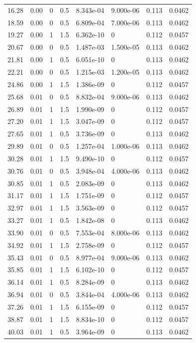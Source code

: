 \documentclass[preview]{standalone}
\begin{document}
{{\begin{tabular}{L{1.2cm}C{1.2cm} C{0.3cm}C{0.5cm} C{1.4cm}C{1.4cm} C{1.4cm}C{1.4cm}}
  16.28  &  0.00  & 0     & 0.5 &  8.343e-04  & 9.000e-06  & 0.113 &  0.0462   \\ 
  18.59  &  0.00  & 0     & 0.5 &  6.809e-04  & 7.000e-06  & 0.113 &  0.0462   \\ 
  19.27  &  0.00  & 1     & 1.5 &  6.362e-10  & 0  & 0.112 &  0.0457   \\ 
  20.67  &  0.00  & 0     & 0.5 &  1.487e-03  & 1.500e-05  & 0.113 &  0.0462   \\ 
  21.81  &  0.00  & 1     & 0.5 &  6.051e-10  & 0  & 0.113 &  0.0462   \\ 
  22.21  &  0.00  & 0     & 0.5 &  1.215e-03  & 1.200e-05  & 0.113 &  0.0462   \\ 
  24.86  &  0.00  & 1     & 1.5 &  1.386e-09  & 0  & 0.112 &  0.0457   \\ 
  25.68  &  0.01  & 0     & 0.5 &  8.832e-04  & 9.000e-06  & 0.113 &  0.0462   \\ 
  26.89  &  0.01  & 1     & 1.5 &  1.990e-09  & 0  & 0.112 &  0.0457   \\ 
  27.20  &  0.01  & 1     & 1.5 &  3.047e-09  & 0  & 0.112 &  0.0457   \\ 
  27.65  &  0.01  & 1     & 0.5 &  3.736e-09  & 0  & 0.113 &  0.0462   \\ 
  29.89  &  0.01  & 0     & 0.5 &  1.257e-04  & 1.000e-06  & 0.113 &  0.0462   \\ 
  30.28  &  0.01  & 1     & 1.5 &  9.490e-10  & 0  & 0.112 &  0.0457   \\ 
  30.76  &  0.01  & 0     & 0.5 &  3.948e-04  & 4.000e-06  & 0.113 &  0.0462   \\ 
  30.85  &  0.01  & 1     & 0.5 &  2.083e-09  & 0  & 0.113 &  0.0462   \\ 
  31.17  &  0.01  & 1     & 1.5 &  1.751e-09  & 0  & 0.112 &  0.0457   \\ 
  32.97  &  0.01  & 1     & 1.5 &  3.563e-09  & 0  & 0.112 &  0.0457   \\ 
  33.27  &  0.01  & 1     & 0.5 &  1.842e-08  & 0  & 0.113 &  0.0462   \\ 
  33.90  &  0.01  & 0     & 0.5 &  7.553e-04  & 8.000e-06  & 0.113 &  0.0462   \\ 
  34.92  &  0.01  & 1     & 1.5 &  2.758e-09  & 0  & 0.112 &  0.0457   \\ 
  35.43  &  0.01  & 0     & 0.5 &  8.977e-04  & 9.000e-06  & 0.113 &  0.0462   \\ 
  35.85  &  0.01  & 1     & 1.5 &  6.102e-10  & 0  & 0.112 &  0.0457   \\ 
  36.14  &  0.01  & 1     & 0.5 &  8.284e-09  & 0  & 0.113 &  0.0462   \\ 
  36.94  &  0.01  & 0     & 0.5 &  3.844e-04  & 4.000e-06  & 0.113 &  0.0462   \\ 
  37.26  &  0.01  & 1     & 1.5 &  6.155e-09  & 0  & 0.112 &  0.0457   \\ 
  38.87  &  0.01  & 1     & 1.5 &  8.834e-10  & 0  & 0.112 &  0.0457   \\ 
  40.03  &  0.01  & 1     & 0.5 &  3.964e-09  & 0  & 0.113 &  0.0462   \\ 
\hline 
\end{tabular} 

}}
\end{document}
